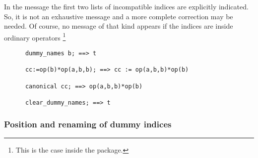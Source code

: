 In the message the first two lists of incompatible indices are
explicitly indicated. So, it is not an exhaustive message and a more
complete correction may be needed.
Of course, no message of that kind appears if the indices are inside
ordinary operators%
\footnote{This is the case inside the  package.}
\begin{verbatim}
      dummy_names b; ==> t

      cc:=op(b)*op(a,b,b); ==> cc := op(a,b,b)*op(b)

      canonical cc; ==> op(a,b,b)*op(b)

      clear_dummy_names; ==> t
\end{verbatim}
\subsubsection{Position and renaming of dummy indices}

